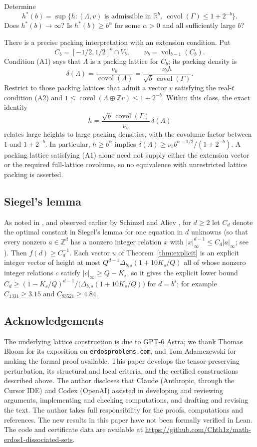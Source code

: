 \documentclass[12pt]{article}
\newcommand{\Z}{\mathbb{Z}}
\newcommand{\R}{\mathbb{R}}
\newcommand{\covol}{\operatorname{covol}}
\newcommand{\Lat}{\Lambda}
\begin{document}
\begin{problem}
Determine
\[
 h^*(b)=\sup\{h:(\Lat,v)\text{ is admissible in }\R^b,
                 \ \covol(\Gamma)\le1+2^{-b}\}.
\]
Does $h^*(b)\to\infty$? Is $h^*(b)\ge b^\alpha$ for some
$\alpha>0$ and all sufficiently large $b$?
\end{problem}

There is a precise packing interpretation with an extension
condition. Put
\[
 C_b=[-1/2,1/2]^b\cap V_b,\qquad
 \nu_b=\operatorname{vol}_{b-1}(C_b).
\]
Condition (A1) says that $\Lat$ is a packing lattice for $C_b$;
its packing density is
\[
 \delta(\Lat)=\frac{\nu_b}{\covol(\Lat)}
             =\frac{\nu_b h}{\sqrt b\,\covol(\Gamma)}.
\]
Restrict to those packing lattices that admit a vector $v$ satisfying
the real-$t$ condition (A2) and
$1\le\covol(\Lat\oplus\Z v)\le1+2^{-b}$. Within this class,
the exact identity
\[
 h=\frac{\sqrt b\,\covol(\Gamma)}{\nu_b}\,\delta(\Lat)
\]
relates large heights to large packing densities, with the
covolume factor between $1$ and $1+2^{-b}$. In particular,
$h\ge b^\alpha$ implies
$\delta(\Lat)\ge \nu_b b^{\alpha-1/2}/(1+2^{-b})$.
A packing lattice satisfying (A1) alone need not supply either the
extension vector or the required full-lattice covolume, so no
equivalence with unrestricted lattice packing is asserted.

\subsection{Siegel's lemma}
As noted in \cite{EP1}, and observed earlier by Schinzel and Aliev \cite{Al08}, for $d\ge2$ let $C_d$ denote the optimal constant in
Siegel's lemma for one equation in $d$ unknowns (so that every nonzero $a\in\Z^d$ has a nonzero integer relation $x$
with $|x|_\infty^{d-1}\le C_d|a|_\infty$; see \cite{BoVa83}). Then $f(d)\ge C_d^{-1}$. Each vector $u$ of Theorem~\ref{thm:explicit} is an explicit integer vector of
height at most $Q^{d-1}\Delta_{b,s}(1+10K_s/Q)$ all of whose nonzero integer relations $c$ satisfy $|c|_\infty\ge Q-K_s$,
so it gives the explicit lower bound $C_d\ge(1-K_s/Q)^{d-1}/\bigl(\Delta_{b,s}(1+10K_s/Q)\bigr)$ for $d=b^s$; for example
$C_{1331}\ge3.15$ and $C_{83521}\ge4.84$.

\subsection*{Acknowledgements}
The underlying lattice construction is due to GPT-6 Astra; we thank Thomas Bloom for its exposition on
\texttt{erdosproblems.com}, and Tom Adamczewski for making the formal proof available. This paper develops the
tensor-preserving perturbation, its structural and local criteria, and the certified constructions described above.
The author discloses that Claude (Anthropic, through the Cursor IDE) and Codex (OpenAI) assisted in developing and
reviewing arguments, implementing and checking computations, and drafting and revising the text. The author takes
full responsibility for the proofs, computations and references. The new results in this paper have not been
formally verified in Lean.
The code and certificate data are available at \url{https://github.com/Chth1z/math-erdos1-dissociated-sets}.
\end{document}
